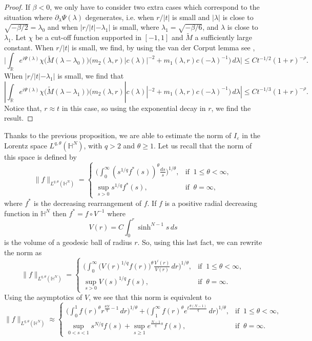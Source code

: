 \documentclass[10pt,leqno]{amsart}
\newcommand{\huom}[2][1=]{\todo[linecolor=red,backgroundcolor=red!10,bordercolor=red,#1]{#2}}
\numberwithin{equation}{section}
\newcommand{\field}[1]{\mathbb{#1}}
\newcommand{\R}{\field{R}}          		%
\begin{document}
\begin{proof}
If $\beta<0$, we only have to consider two extra cases which correspond to the situation where $\partial_\lambda\Psi(\lambda)$ degenerates, i.e. when $r/|t|$ is small and $|\lambda|$ is close to 
$\sqrt{-\beta/2}=\lambda_0$  and when $|r/|t| -\lambda_1|$ is small, where  $\lambda_1 =\sqrt{-\beta/6}$, and $\lambda$ is close to $\lambda_1$. Let $\chi$ be a cut-off function supported in $[-1,1]$
and $\tilde{M}$ a sufficiently large constant. When $r/|t|$ is small, we find, by using the van der Corput lemma see \cite[Step 6]{MR1745182}, 
$$\Big|\int_\R e^{i\Psi (\lambda )} \chi \big(\tilde{M} (\lambda -\lambda_0 ) \big) \big(m_2 (\lambda ,r)|c(\lambda)|^{-2}+m_1(\lambda,r) c(-\lambda)^{-1} \big)\, d\lambda \Big|\leq Ct^{-1/2} (1 +r)^{-\rho}.$$
When $|r/|t| -\lambda_1|$ is small, we find that
$$|\int_\R e^{i\Psi (\lambda )} \chi \big(\tilde{M} (\lambda -\lambda_1 ) \big)  \big(m_2 (\lambda ,r) |c(\lambda)|^{-2}+m_1(\lambda,r) c(-\lambda)^{-1} \big)\, d\lambda  |\leq Ct^{-1/3} (1 +r)^{-\rho} .$$
Notice that, $r\approx t$ in this case, so using the exponential decay in $r$, we find the result.







\end{proof}


Thanks to the previous proposition, 
we are able to estimate the norm of $I_\varepsilon$ in the Lorentz space $L^{q,\theta}(\mathbb{H}^N)$, with $q>2$ and $\theta\geq 1$. Let us recall that the norm of this space is defined by
$$\|f\|_{L^{q,\theta}(\mathbb{H}^N)}= \begin{cases}\big( \int_0^\infty  (s^{1/q} f^\ast (s))^\theta \frac{ds}{s}\big)^{1/\theta},&\mbox{if }\ 1\leq \theta <\infty ,\\ \sup_{s>0} s^{1/q} f^\ast (s),&\mbox{if }\ \theta=\infty , \end{cases}$$
where $f^\ast$ is the decreasing rearrangement of $f$. If $f$ is a positive radial decreasing function in $\mathbb{H}^N$ then $f^\ast = f \circ V^{-1}$ where
$$V(r)=C \int_0^r \sinh^{N-1}s\, ds$$
is the volume of a geodesic ball of radius $r$.
So, using this last fact, we can rewrite the norm as
$$\|f\|_{L^{q,\theta}(\mathbb{H}^N)} =\begin{cases} \big(\int_0^\infty \big(V(r)^{1/q} f(r)\big)^{\theta} \frac{V^\prime (r)}{V(r)}\, dr \big)^{1/\theta}, &\mbox{if }\ 1\leq \theta <\infty ,\\ \sup_{s>0} V(s)^{1/q} f (s),&\mbox{if }\ \theta=\infty . \end{cases}$$
Using the asymptotics of $V$, we see that this norm is equivalent to
$$\|f\|_{L^{q,\theta}(\mathbb{H}^N)} \approx \begin{cases} \big(\int_0^1  f(r)^{\theta} r^{\tfrac{\theta N }{q}-1}\, dr \big)^{1/\theta}+ \big(\int_1^\infty  f(r)^{\theta} e^{t\frac{\theta (N-1) }{q}} \,dr \big)^{1/\theta} , &\mbox{if }\ 1\leq \theta <\infty ,\\ \sup_{0<s<1} s^{N/q} f (s)+\sup_{s\geq 1} e^{\tfrac{N-1}{q}s} f(s),&\mbox{if }\ \theta=\infty . \end{cases}$$
\end{document}
